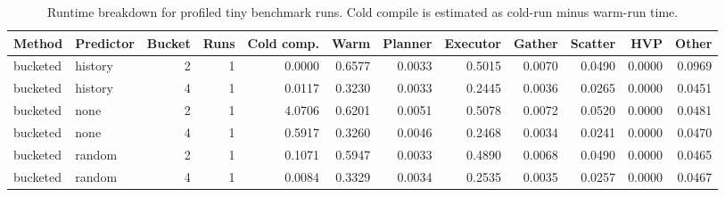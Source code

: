 \begin{table}[t]
\centering
\caption{Runtime breakdown for profiled tiny benchmark runs. Cold compile is estimated as cold-run minus warm-run time.}
\label{tab:runtime-breakdown}
\begin{tabular}{llrrrrrrrrrr}
\hline
Method & Predictor & Bucket & Runs & Cold comp. & Warm & Planner & Executor & Gather & Scatter & HVP & Other \\
\hline
bucketed & history & 2 & 1 & 0.0000 & 0.6577 & 0.0033 & 0.5015 & 0.0070 & 0.0490 & 0.0000 & 0.0969 \\
bucketed & history & 4 & 1 & 0.0117 & 0.3230 & 0.0033 & 0.2445 & 0.0036 & 0.0265 & 0.0000 & 0.0451 \\
bucketed & none & 2 & 1 & 4.0706 & 0.6201 & 0.0051 & 0.5078 & 0.0072 & 0.0520 & 0.0000 & 0.0481 \\
bucketed & none & 4 & 1 & 0.5917 & 0.3260 & 0.0046 & 0.2468 & 0.0034 & 0.0241 & 0.0000 & 0.0470 \\
bucketed & random & 2 & 1 & 0.1071 & 0.5947 & 0.0033 & 0.4890 & 0.0068 & 0.0490 & 0.0000 & 0.0465 \\
bucketed & random & 4 & 1 & 0.0084 & 0.3329 & 0.0034 & 0.2535 & 0.0035 & 0.0257 & 0.0000 & 0.0467 \\
\hline
\end{tabular}
\end{table}
